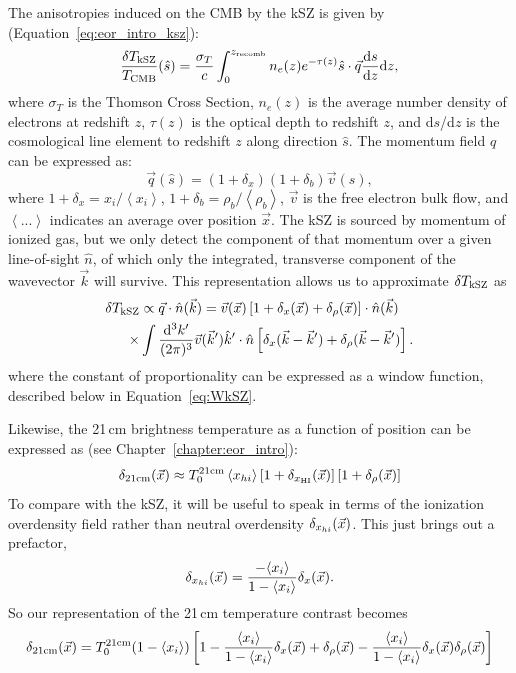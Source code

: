 The anisotropies induced on the CMB by the kSZ is given by (Equation~\ref{eq:eor_intro_ksz}):
\begin{equation}
\frac{\delta T_{\rm kSZ}}{T_{\rm CMB}}(\hat{s}) = \frac{\sigma_T}{c} \int_0^{z_{\rm recomb}} n_e(z)e^{-\tau(z)} \hat{s}\cdot\vec{q} \frac{{\rm d}s}{{\rm d}z}{\rm d}z,
\end{equation}
where $\sigma_T$ is the Thomson Cross Section, $n_e(z)$ is the average number density of electrons at redshift $z$, $\tau(z)$ is the optical depth to redshift $z$, and d$s$/d$z$ is the cosmological line element to redshift $z$ along direction $\hat{s}$. 
The momentum field $q$ can be expressed as:
\begin{equation}
\vec{q}(\hat{s}) = (1+\delta_x)(1+\delta_b)\vec{v}(\hat{s}),
\end{equation}
where  $1+\delta_x = x_i/\left\langle x_i \right\rangle$, $1+\delta_b= \rho_b/\left\langle \rho_b \right\rangle$, $\vec{v}$ is the free electron bulk flow, and $\left\langle ... \right\rangle$ indicates an average over position $\vec{x}$. 
The kSZ is sourced by momentum of ionized gas, but we only detect the component of that momentum over a given line-of-sight $\hat{n}$, of which only the integrated, transverse component of the wavevector $\vec{k}$ will survive.
This representation allows us to approximate $\delta T_{\rm kSZ}$ as
\begin{align}
\delta T_{\rm kSZ} &\propto \vec{q}\cdot\hat{n}(\vec{k}) = \vec{v}(\vec{x})\left[1 + \delta_x(\vec{x}) + \delta_{\rho}(\vec{x})\right]\cdot\hat{n}(\vec{k})\\
\times & \int \frac{{\rm d}^3k'}{(2\pi)^3}\vec{v}(\vec{k}')\hat{k}'\cdot\hat{n}\left[\delta_x(\vec{k}-\vec{k}') + \delta_{\rho}(\vec{k}-\vec{k}')\right].
\end{align}
where the constant of proportionality can be expressed as a window function, described below in Equation~\ref{eq:WkSZ}. 

Likewise, the 21\,cm brightness temperature as a function of position can be expressed as (see Chapter~\ref{chapter:eor_intro}):
\begin{equation}
\delta_{\rm 21cm}(\vec{x}) \approx T_0^{\rm 21cm} \left\langle x_{\sc hi} \right\rangle \left[1 + \delta_{x_{\rm HI}}(\vec{x})\right] \left[1 + \delta_\rho(\vec{x})\right]
\label{eq:d21cm}
\end{equation}
To compare with the kSZ, it will be useful to speak in terms of the ionization overdensity field rather than neutral overdensity $\delta_{x_{\sc hi}}(\vec{x})$. This just brings out a prefactor,
\begin{equation}
\delta_{x_{\sc hi}}(\vec{x}) = \frac{-\langle x_i \rangle}{1 - \langle x_i \rangle} \delta_x(\vec{x}).
\end{equation}
So our representation of the 21\,cm temperature contrast becomes
\begin{equation}
\delta_{\rm 21cm}(\vec{x}) = T_0^{\rm21cm} (1 - \langle x_i \rangle ) \left[ 1 - \frac{\langle x_i \rangle}{1 - \langle x_i \rangle} \delta_x(\vec{x}) + \delta_{\rho}(\vec{x})  - \frac{\langle x_i \rangle}{1 - \langle x_i \rangle} \delta_x(\vec{x}) \delta_{\rho}(\vec{x}) \right]
\label{eq:d21cm_x}
\end{equation}

